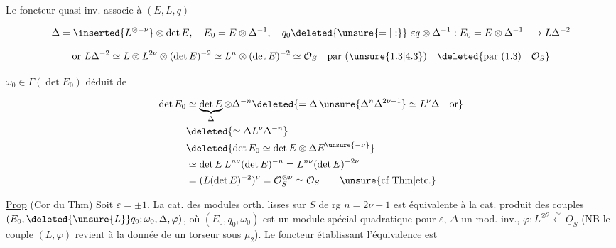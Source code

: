 Le foncteur quasi-inv. associe à $(E,L,q)$


\[
 \Delta=\inserted{L^{\otimes-\nu}}\otimes\det E,\quad
 E_0=E\otimes\Delta^{-1},\quad q_0\deleted{\unsure{=|:}}\ \varepsilon q\otimes\Delta^{-1}:E_0=E\otimes\Delta^{-1}\longrightarrow L\Delta^{-2}
\]

\[
 \text{or }L\Delta^{-2}\simeq L\otimes L^{2\nu}\otimes(\det E)^{-2}\simeq L^n\otimes(\det E)^{-2}\simeq\mathcal O_S
 \quad\text{par }(\unsure{1.3|4.3})\quad\deleted{\text{par }(1.3)\quad\mathcal O_S}
\]

$\omega_0\in\Gamma(\det E_0)$ déduit de

\[
\begin{aligned}
 \det E_0&\simeq\underbrace{\det E}_{\Delta}\otimes\Delta^{-n}
 \deleted{=\Delta\,\unsure{\Delta^n\Delta^{2\nu+1}}\simeq L^\nu\Delta\quad\text{or}}\\
 &\deleted{\simeq\Delta L^\nu\Delta^{-n}}\\
 &\deleted{\det E_0\simeq\det E\otimes\Delta E^{\unsure{-\nu}}}\\
 &\simeq\det E\,L^{n\nu}(\det E)^{-n}=L^{n\nu}(\det E)^{-2\nu}\\
 &=(L(\det E)^{-2})^\nu=\mathcal O_S^{\otimes\nu}\simeq\mathcal O_S\qquad\unsure{\text{cf Thm}|\text{etc.}}
\end{aligned}
\]


\uline{Prop} (Cor du Thm) Soit $\varepsilon=\pm1$. La cat. des modules orth. lisses  sur $S$ de rg $n=2\nu+1$ est équivalente à la cat. produit des couples $(E_0,\deleted{\unsure{L}}q_0;\omega_0,\Delta,\varphi)$, où $(E_0,q_0,\omega_0)$ est un module spécial quadratique pour $\varepsilon$,  $\Delta$ un mod. inv., $\varphi:L^{\otimes2}\overset{\sim}{\longleftarrow}\underline O_S$ (NB le couple $(L,\varphi)$ revient à la donnée de un torseur sous $\mu_2$). Le foncteur établissant l'équivalence est


